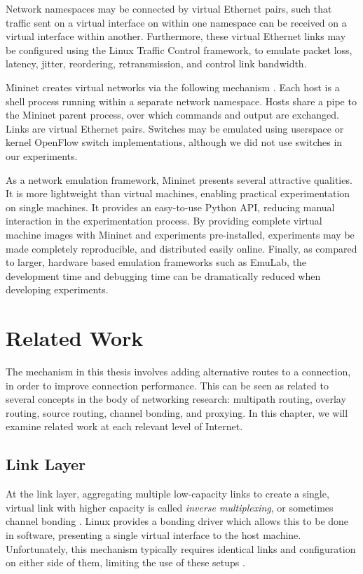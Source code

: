 \documentclass{cwru}
\begin{document}
Network namespaces may be connected by virtual Ethernet pairs, such that traffic
sent on a virtual interface on within one namespace can be received on a virtual
interface within another. Furthermore, these virtual Ethernet links may be
configured using the Linux Traffic Control framework, to emulate packet loss,
latency, jitter, reordering, retransmission, and control link bandwidth.

Mininet creates virtual networks via the following mechanism
\cite{lantz2010network}. Each host is a shell process running within a separate
network namespace. Hosts share a pipe to the Mininet parent process, over which
commands and output are exchanged. Links are virtual Ethernet pairs. Switches
may be emulated using userspace or kernel OpenFlow switch implementations,
although we did not use switches in our experiments.

As a network emulation framework, Mininet presents several attractive qualities.
It is more lightweight than virtual machines, enabling practical experimentation
on single machines. It provides an easy-to-use Python API, reducing manual
interaction in the experimentation process. By providing complete virtual
machine images with Mininet and experiments pre-installed, experiments may be
made completely reproducible, and distributed easily online. Finally, as
compared to larger, hardware based emulation frameworks such as EmuLab, the
development time and debugging time can be dramatically reduced when developing
experiments.

\chapter{Related Work}
\label{c:rw}

The mechanism in this thesis involves adding alternative routes to a connection,
in order to improve connection performance. This can be seen as related to
several concepts in the body of networking research: multipath routing, overlay
routing, source routing, channel bonding, and proxying. In this chapter, we will
examine related work at each relevant level of Internet.

\section{Link Layer}
\label{s:rw-ll}

At the link layer, aggregating multiple low-capacity links to create a single,
virtual link with higher capacity is called \emph{inverse multiplexing}, or
sometimes channel bonding \cite{duncanson1994inverse}. Linux provides a bonding
driver which allows this to be done in software, presenting a single virtual
interface to the host machine. Unfortunately, this mechanism typically requires
identical links and configuration on either side of them, limiting the use of
these setups \cite{chiussi1998generalized}.
\end{document}
